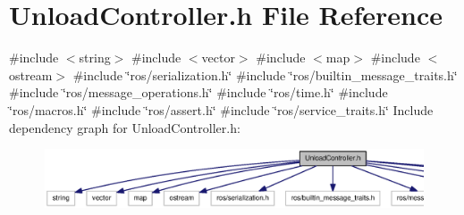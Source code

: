\section{\-Unload\-Controller.\-h \-File \-Reference}
\label{UnloadController_8h}
{\ttfamily \#include $<$string$>$}\*
{\ttfamily \#include $<$vector$>$}\*
{\ttfamily \#include $<$map$>$}\*
{\ttfamily \#include $<$ostream$>$}\*
{\ttfamily \#include \char`\"{}ros/serialization.\-h\char`\"{}}\*
{\ttfamily \#include \char`\"{}ros/builtin\-\_\-message\-\_\-traits.\-h\char`\"{}}\*
{\ttfamily \#include \char`\"{}ros/message\-\_\-operations.\-h\char`\"{}}\*
{\ttfamily \#include \char`\"{}ros/time.\-h\char`\"{}}\*
{\ttfamily \#include \char`\"{}ros/macros.\-h\char`\"{}}\*
{\ttfamily \#include \char`\"{}ros/assert.\-h\char`\"{}}\*
{\ttfamily \#include \char`\"{}ros/service\-\_\-traits.\-h\char`\"{}}\*
\-Include dependency graph for \-Unload\-Controller.\-h\-:
\nopagebreak
\begin{figure}[H]
\begin{center}
\leavevmode
\includegraphics[width=350pt]{UnloadController_8h__incl}
\end{center}
\end{figure}
